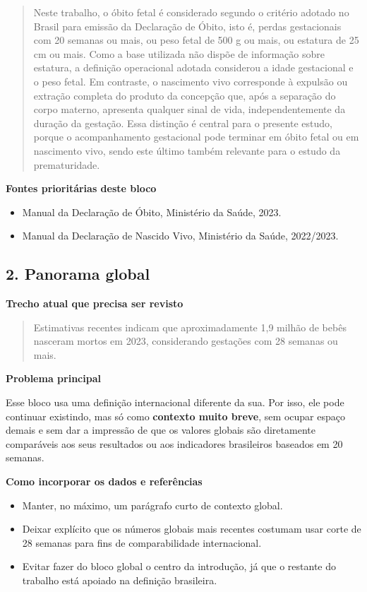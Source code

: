 \documentclass[12pt,a4paper]{article}
\begin{document}
\begin{quote}
Neste trabalho, o óbito fetal é considerado segundo o critério adotado no Brasil para emissão da Declaração de Óbito, isto é, perdas gestacionais com 20 semanas ou mais, ou peso fetal de 500 g ou mais, ou estatura de 25 cm ou mais. Como a base utilizada não dispõe de informação sobre estatura, a definição operacional adotada considerou a idade gestacional e o peso fetal. Em contraste, o nascimento vivo corresponde à expulsão ou extração completa do produto da concepção que, após a separação do corpo materno, apresenta qualquer sinal de vida, independentemente da duração da gestação. Essa distinção é central para o presente estudo, porque o acompanhamento gestacional pode terminar em óbito fetal ou em nascimento vivo, sendo este último também relevante para o estudo da prematuridade.
\end{quote}

\textbf{Fontes prioritárias deste bloco}

\begin{itemize}
\item Manual da Declaração de Óbito, Ministério da Saúde, 2023.
\item Manual da Declaração de Nascido Vivo, Ministério da Saúde, 2022/2023.
\end{itemize}

\subsection*{2. Panorama global}

\textbf{Trecho atual que precisa ser revisto}

\begin{quote}
Estimativas recentes indicam que aproximadamente 1,9 milhão de bebês nasceram mortos em 2023, considerando gestações com 28 semanas ou mais.
\end{quote}

\textbf{Problema principal}

Esse bloco usa uma definição internacional diferente da sua. Por isso, ele pode continuar existindo, mas só como \textbf{contexto muito breve}, sem ocupar espaço demais e sem dar a impressão de que os valores globais são diretamente comparáveis aos seus resultados ou aos indicadores brasileiros baseados em 20 semanas.

\textbf{Como incorporar os dados e referências}

\begin{itemize}
\item Manter, no máximo, um parágrafo curto de contexto global.
\item Deixar explícito que os números globais mais recentes costumam usar corte de 28 semanas para fins de comparabilidade internacional.
\item Evitar fazer do bloco global o centro da introdução, já que o restante do trabalho está apoiado na definição brasileira.
\end{itemize}
\end{document}

